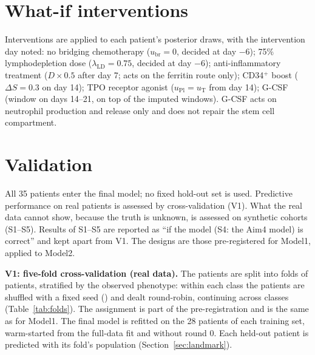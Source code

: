 \documentclass[11pt]{article}
\begin{document}
\section{What-if interventions}
Interventions are applied to each patient's posterior draws, with the intervention day noted: no bridging chemotherapy ($u_{\mathrm{br}}=0$, decided at day $-6$); 75\% lymphodepletion dose ($\lambda_{\mathrm{LD}}=0.75$, decided at day $-6$); anti-inflammatory treatment ($D\times0.5$ after day 7; acts on the ferritin route only); CD34$^+$ boost ($\Delta S=0.3$ on day 14); TPO receptor agonist ($u_{\mathrm{Pl}}=u_{\mathrm{T}}$ from day 14); G-CSF (window on days 14--21, on top of the imputed windows). G-CSF acts on neutrophil production and release only and does not repair the stem cell compartment.

\section{Validation}\label{sec:validation}
All 35 patients enter the final model; no fixed hold-out set is used. Predictive performance on real patients is assessed by cross-validation (V1). What the real data cannot show, because the truth is unknown, is assessed on synthetic cohorts (S1--S5). Results of S1--S5 are reported as ``if the model (S4: the Aim4 model) is correct'' and kept apart from V1. The designs are those pre-registered for Model1, applied to Model2.

\textbf{V1: five-fold cross-validation (real data).} The patients are split into \valVk{} folds of \valVper{} patients, stratified by the observed phenotype: within each class the patients are shuffled with a fixed seed (\valVseed) and dealt round-robin, continuing across classes (Table~\ref{tab:folds}). The assignment is part of the pre-registration and is the same as for Model1. The final model is refitted on the 28 patients of each training set, warm-started from the full-data fit and without round 0. Each held-out patient is predicted with its fold's population (Section~\ref{sec:landmark}).


\end{document}
